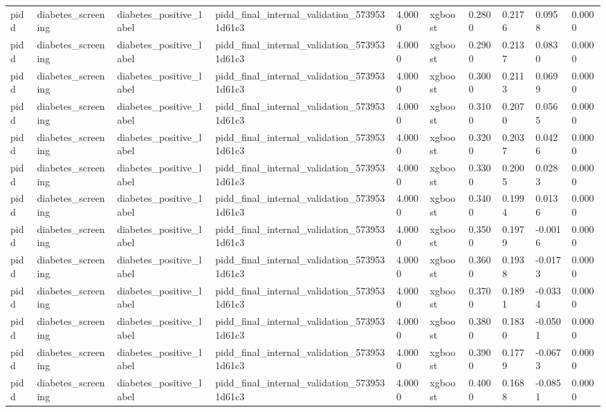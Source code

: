 \begin{tabular}{llllllllll}
pidd & diabetes\_screening & diabetes\_positive\_label & pidd\_final\_internal\_validation\_5739531d61c3 & 4.0000 & xgboost & 0.2800 & 0.2176 & 0.0958 & 0.0000 \\
pidd & diabetes\_screening & diabetes\_positive\_label & pidd\_final\_internal\_validation\_5739531d61c3 & 4.0000 & xgboost & 0.2900 & 0.2137 & 0.0830 & 0.0000 \\
pidd & diabetes\_screening & diabetes\_positive\_label & pidd\_final\_internal\_validation\_5739531d61c3 & 4.0000 & xgboost & 0.3000 & 0.2113 & 0.0699 & 0.0000 \\
pidd & diabetes\_screening & diabetes\_positive\_label & pidd\_final\_internal\_validation\_5739531d61c3 & 4.0000 & xgboost & 0.3100 & 0.2070 & 0.0565 & 0.0000 \\
pidd & diabetes\_screening & diabetes\_positive\_label & pidd\_final\_internal\_validation\_5739531d61c3 & 4.0000 & xgboost & 0.3200 & 0.2037 & 0.0426 & 0.0000 \\
pidd & diabetes\_screening & diabetes\_positive\_label & pidd\_final\_internal\_validation\_5739531d61c3 & 4.0000 & xgboost & 0.3300 & 0.2005 & 0.0283 & 0.0000 \\
pidd & diabetes\_screening & diabetes\_positive\_label & pidd\_final\_internal\_validation\_5739531d61c3 & 4.0000 & xgboost & 0.3400 & 0.1994 & 0.0136 & 0.0000 \\
pidd & diabetes\_screening & diabetes\_positive\_label & pidd\_final\_internal\_validation\_5739531d61c3 & 4.0000 & xgboost & 0.3500 & 0.1979 & -0.0016 & 0.0000 \\
pidd & diabetes\_screening & diabetes\_positive\_label & pidd\_final\_internal\_validation\_5739531d61c3 & 4.0000 & xgboost & 0.3600 & 0.1938 & -0.0173 & 0.0000 \\
pidd & diabetes\_screening & diabetes\_positive\_label & pidd\_final\_internal\_validation\_5739531d61c3 & 4.0000 & xgboost & 0.3700 & 0.1891 & -0.0334 & 0.0000 \\
pidd & diabetes\_screening & diabetes\_positive\_label & pidd\_final\_internal\_validation\_5739531d61c3 & 4.0000 & xgboost & 0.3800 & 0.1830 & -0.0501 & 0.0000 \\
pidd & diabetes\_screening & diabetes\_positive\_label & pidd\_final\_internal\_validation\_5739531d61c3 & 4.0000 & xgboost & 0.3900 & 0.1779 & -0.0673 & 0.0000 \\
pidd & diabetes\_screening & diabetes\_positive\_label & pidd\_final\_internal\_validation\_5739531d61c3 & 4.0000 & xgboost & 0.4000 & 0.1688 & -0.0851 & 0.0000 \\

\end{tabular}
